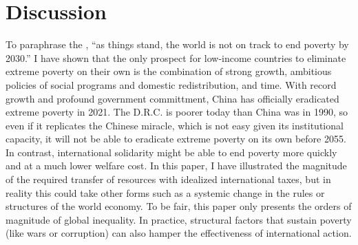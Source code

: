 \section{Discussion} 

To paraphrase the \cite{un_sustainable_2022}, ``as things stand, the world is not on track to end poverty by 2030.'' I have shown that the only prospect for low-income countries to eliminate extreme poverty on their own is the combination of strong growth, ambitious policies of social programs and domestic redistribution, and time. 
With record growth and profound government committment, China has officially eradicated extreme poverty in 2021. The D.R.C. is poorer today than China was in 1990, %
so even if it replicates the Chinese miracle, which is not easy given its institutional capacity, it will not be able to eradicate extreme poverty on its own before 2055. %
In contrast, international solidarity might be able to end poverty more quickly and at a much lower welfare cost. In this paper, I have illustrated the magnitude of the required transfer of resources with idealized international taxes, but in reality this could take other forms such as a systemic change in the rules or structures of the world economy. 
To be fair, this paper only presents the orders of magnitude of global inequality. %
In practice, structural factors that sustain poverty (like wars or corruption) %
can also hamper the effectiveness of international action. %



